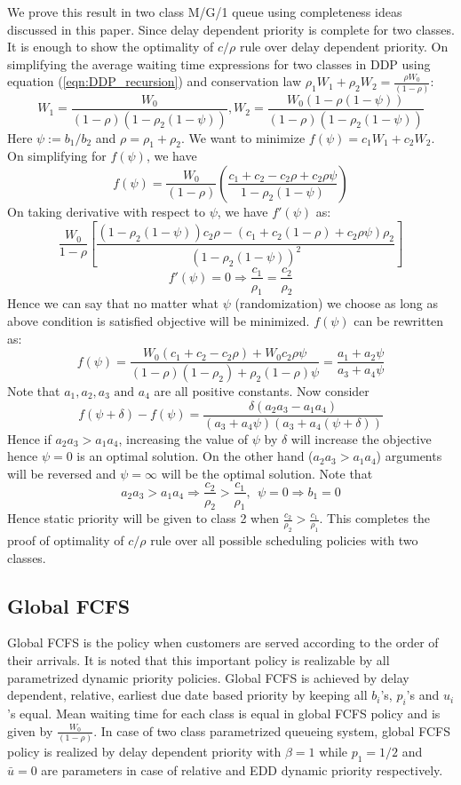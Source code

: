 \documentclass[a4paper,12pt]{article}
\begin{document}
We prove this result in two class M/G/1 queue using completeness ideas discussed in this paper. Since delay dependent priority is complete for two classes. It is enough to show the optimality of $c/\rho$ rule over delay dependent priority. On simplifying the average waiting time expressions for two classes in DDP using equation (\ref{eqn:DDP_recursion}) and conservation law $\rho_1W_1+\rho_2W_2 = \frac{\rho W_0}{(1-\rho)}$:
\begin{equation}
W_1 =  \frac{W_0}{(1-\rho)(1-\rho_2(1-\psi))}, W_2 = \frac{W_0(1-\rho(1-\psi))}{(1-\rho)(1-\rho_2(1-\psi))}%
\end{equation} 
Here $\psi := b_1/b_2$ and $\rho = \rho_1 + \rho_2$. We want to minimize $f(\psi) = c_1W_1+c_2W_2$. On simplifying for $f(\psi)$, we have 
\begin{equation}
f(\psi) =  \frac{W_0}{(1-\rho)}\left(\frac{c_1 + c_2 - c_2\rho +c_2\rho\psi}{1-\rho_2(1-\psi)} \right)
\end{equation}
On taking derivative with respect to $\psi$, we have $f'(\psi)$ as:
\begin{equation}\nonumber
\frac{W_0}{1-\rho}\left[\frac{(1-\rho_2(1-\psi))c_2\rho - (c_1+c_2(1-\rho) + c_2\rho\psi)\rho_2}{(1-\rho_2(1-\psi))^2}\right]
\end{equation}
$$f'(\psi) = 0 \Rightarrow \frac{c_1}{\rho_1} = \frac{c_2}{\rho_2}$$
Hence we can say that no matter what $\psi$ (randomization) we choose as long as above condition is satisfied objective will be minimized. $f(\psi)$ can be rewritten as:
$$f(\psi) = \frac{W_0(c_1+c_2 - c_2 \rho) + W_0 c_2\rho\psi}{(1-\rho)(1-\rho_2) + \rho_2(1-\rho)\psi} = \frac{a_1 + a_2\psi}{a_3 + a_4\psi}$$
Note that $a_1,a_2, a_3 \text{ and } a_4$ are all positive constants. Now consider 
$$f(\psi +\delta) - f(\psi) = \frac{\delta(a_2a_3 - a_1a_4)}{(a_3+a_4\psi)(a_3+a_4(\psi+\delta))}$$
Hence if $a_2a_3 > a_1a_4$, increasing the value of $\psi$ by $\delta$ will increase the objective hence $\psi = 0$ is an optimal solution. On the other hand ($a_2a_3 > a_1a_4$) arguments will be reversed and $\psi = \infty$ will be the optimal solution. Note that 
$$a_2a_3 > a_1a_4 \Rightarrow \frac{c_2}{\rho_2} > \frac{c_1}{\rho_1}, ~~\psi = 0 \Rightarrow b_1 = 0$$ 
Hence static priority will be given to class 2 when $\frac{c_2}{\rho_2} > \frac{c_1}{\rho_1}$. This completes the proof of optimality of $c/\rho$ rule over all possible scheduling policies with two classes.
\subsection{Global FCFS}
Global FCFS is the policy when customers are served according to the order of their arrivals. It is noted that this important policy is realizable by all parametrized dynamic priority policies. Global FCFS is achieved by delay dependent, relative, earliest due date based priority by keeping all $b_i$'s, $p_i$'s and $u_i$'s equal. Mean waiting time for each class is equal in global FCFS policy and is given by $\frac{W_0}{(1-\rho)}$. In case of two class parametrized queueing system, global FCFS policy is realized by delay dependent priority with $\beta=1$ while $p_1 =1/2$ and $\bar{u} = 0$ are parameters in case of relative and EDD dynamic priority respectively.
\end{document}
